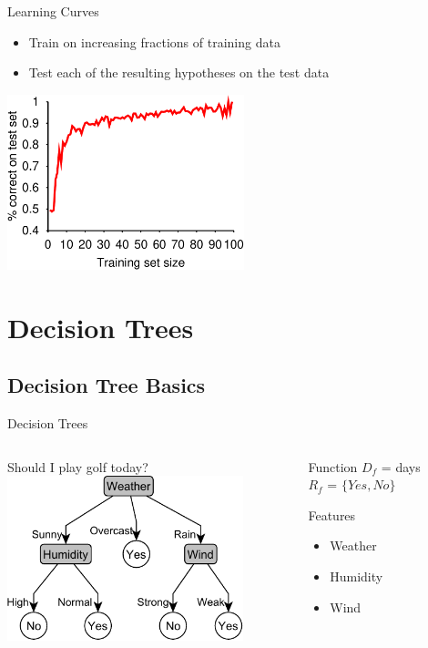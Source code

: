 \documentclass[14pt]{beamer}
\begin{document}
\begin{frame}{Learning Curves}
\begin{itemize}
\item Train on increasing fractions of training data
\item Test each of the resulting hypotheses on the test data
\end{itemize}
\pause
\begin{center}
\includegraphics[height=2in]{restaurant-dtl-curve}
\end{center}
\end{frame}

\section{Decision Trees}

\subsection{Decision Tree Basics}

\begin{frame}{Decision Trees}
\begin{columns}
\begin{column}{2.7in}
\centering
Should I play golf today? \\
\bigskip
\includegraphics[width=2.7in]{play_golf}
\end{column}
\begin{column}{1.5in}
\begin{block}{Function}
$D_f$ = days \\
$R_f$ = $\{\textit{Yes}, \textit{No}\}$
\end{block}
\bigskip
\begin{block}{Features}
\begin{itemize}
\item Weather
\item Humidity
\item Wind
\end{itemize}
\end{block}
\end{column}
\end{columns}
\end{frame}
\end{document}
